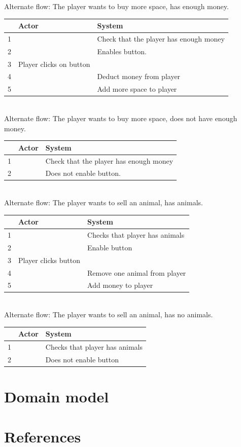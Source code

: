 \documentclass{article}
\begin{document}
Alternate flow: The player wants to buy more space, has enough money.\\
\begin{tabular}{|c|l|l|} \hline
    & Actor & System \\ \hline
    1 & & Check that the player has enough money \\ \hline
    2 & & Enables button. \\ \hline
    3 & Player clicks on button \\ \hline
    4 & & Deduct money from player \\ \hline
    5 & & Add more space to player \\ \hline
\end{tabular}\\
Alternate flow: The player wants to buy more space, does not have enough money.\\
\begin{tabular}{|c|l|l|} \hline
    & Actor & System \\ \hline
    1 & & Check that the player has enough money \\ \hline
    2 & & Does not enable button. \\ \hline
\end{tabular}\\
Alternate flow: The player wants to sell an animal, has animals.\\
\begin{tabular}{|c|l|l|} \hline
    & Actor & System \\ \hline
    1 & & Checks that player has animals \\ \hline
    2 & & Enable button \\ \hline
    3 & Player clicks button & \\ \hline
    4 & & Remove one animal from player \\ \hline
    5 & & Add money to player \\ \hline
\end{tabular}\\
Alternate flow: The player wants to sell an animal, has no animals.\\
\begin{tabular}{|c|l|l|} \hline
    & Actor & System \\ \hline
    1 & & Checks that player has animals \\ \hline
    2 & & Does not enable button \\ \hline
\end{tabular}

\section{Domain model}
\setlength\fboxsep{0pt}
\setlength\fboxrule{0.5pt}
\section{References}
\end{document}
